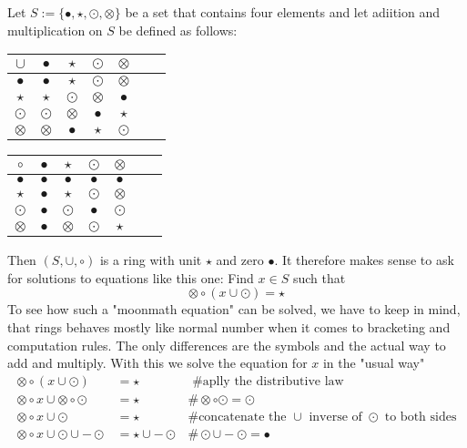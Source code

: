 \begin{example} Let $S:=\{\bullet,\star,\odot,\otimes\}$ be a set that contains four elements and let adiition and multiplication on $S$ be defined as follows:
\begin{center}
  \begin{tabular}{c | c c c c c c}
    $\cup$ & $\bullet$ & $\star$ & $\odot$ & $\otimes$ \\\hline
    $\bullet$ & $\bullet$ & $\star$ & $\odot$ & $\otimes$ \\
    $\star$ & $\star$ & $\odot$ & $\otimes$ & $\bullet$ \\
    $\odot$ & $\odot$ & $\otimes$ & $\bullet$ & $\star$ \\
    $\otimes$ & $\otimes$ & $\bullet$ & $\star$ & $\odot$ \\
  \end{tabular} \quad \quad \quad \quad
  \begin{tabular}{c | c c c c c c}
$ \circ $ & $\bullet$ & $\star$ & $\odot$ & $\otimes$ & \\\hline
        $\bullet$ & $\bullet$ & $\bullet$ & $\bullet$ & $\bullet$ &\\
        $\star$ & $\bullet$ & $\star$ & $\odot$ & $\otimes$ &\\
        $\odot$ & $\bullet$ & $\odot$ & $\bullet$ & $\odot$ &\\
        $\otimes$ & $\bullet$ & $\otimes$ & $\odot$ & $\star$ &\\
  \end{tabular}
\end{center}
Then $(S,\cup,\circ)$ is a ring with unit $\star$ and zero $\bullet$. It therefore makes sense to ask for solutions to equations like this one:
Find $x\in S$ such that
$$
\otimes \circ (x \cup \odot ) = \star
$$
To see how such a "moonmath equation" can be solved, we have to keep in mind, that rings behaves mostly like normal number when it comes to bracketing and computation rules. The only differences are the symbols and the actual way to add and multiply. With this we solve the equation for $x$ in the "usual way"
\begin{align*}
\otimes \circ (x \cup \odot ) &= \star & \text{ \# aplly the distributive law}\\
\otimes \circ x \cup \otimes \circ \odot  &= \star &\# \otimes \circ \odot = \odot\\
\otimes \circ x \cup \odot  &= \star & \text{\# concatenate the $\cup$ inverse of $\odot$ to both sides}\\
\otimes \circ x \cup \odot \cup -\odot  &= \star \cup -\odot & \# \odot \cup -\odot = \bullet\\

\end{align*}
\end{example}
